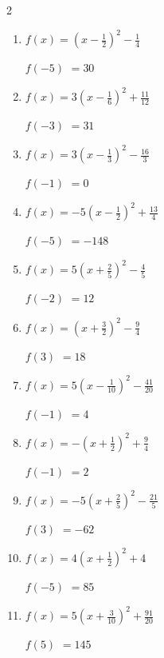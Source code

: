 \begin{multicols}{2}
\begin{enumerate}
\resetques

  \item $\displaystyle f(x)=\left( x-\frac{1}{2}\right)^{2}-\frac{1}{4}$

$f(-5)$
        $=30$

  \item $\displaystyle f(x)=3\left( x-\frac{1}{6}\right)^{2}+\frac{11}{12}$

$f(-3)$
        $=31$

  \item $\displaystyle f(x)=3\left( x-\frac{1}{3}\right)^{2}-\frac{16}{3}$

$f(-1)$
        $=0$

  \item $\displaystyle f(x)=-5\left( x-\frac{1}{2}\right)^{2}+\frac{13}{4}$

$f(-5)$
        $=-148$

  \item $\displaystyle f(x)=5\left( x+\frac{2}{5}\right)^{2}-\frac{4}{5}$

$f(-2)$
        $=12$

\columnbreak %

  \item $\displaystyle f(x)=\left( x+\frac{3}{2}\right)^{2}-\frac{9}{4}$

$f(3)$
        $=18$

  \item $\displaystyle f(x)=5\left( x-\frac{1}{10}\right)^{2}-\frac{41}{20}$

$f(-1)$
        $=4$

  \item $\displaystyle f(x)=-\left( x+\frac{1}{2}\right)^{2}+\frac{9}{4}$

$f(-1)$
        $=2$

  \item $\displaystyle f(x)=-5\left( x+\frac{2}{5}\right)^{2}-\frac{21}{5}$

$f(3)$
        $=-62$

  \item $\displaystyle f(x)=4\left( x+\frac{1}{2}\right)^{2}+4$

$f(-5)$
        $=85$

\columnbreak %

\resetques

  \item $\displaystyle f(x)=5\left( x+\frac{3}{10}\right)^{2}+\frac{91}{20}$

$f(5)$
        $=145$


\end{enumerate}
\end{multicols}
